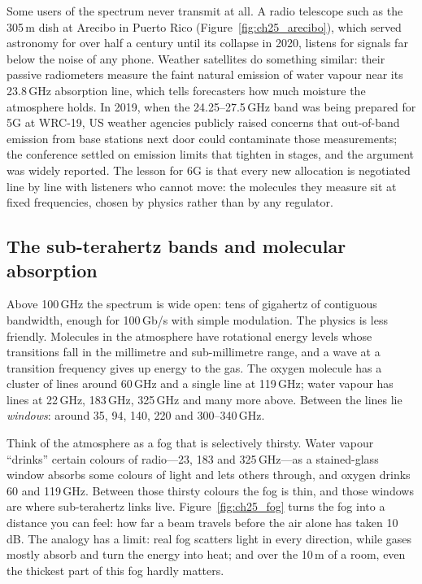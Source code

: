 
\begin{history}
Some users of the spectrum never transmit at all. A radio telescope such as the 305\,m dish at
Arecibo in Puerto Rico (Figure~\ref{fig:ch25_arecibo}), which served astronomy for over half a
century until its collapse in 2020, listens for signals far below the noise of any phone. Weather
satellites do something similar: their passive radiometers measure the faint natural emission of
water vapour near its 23.8\,GHz absorption line, which tells forecasters how much moisture the
atmosphere holds. In 2019, when the 24.25--27.5\,GHz band was being prepared for 5G at WRC-19, US
weather agencies publicly raised concerns that out-of-band emission from base stations next door
could contaminate those measurements; the conference settled on emission limits that tighten in
stages, and the argument was widely reported. The lesson for 6G is that every new allocation is
negotiated line by line with listeners who cannot move: the molecules they measure sit at fixed
frequencies, chosen by physics rather than by any regulator.
\end{history}

\subsection{The sub-terahertz bands and molecular absorption}

Above 100\,GHz the spectrum is wide open: tens of gigahertz of contiguous bandwidth, enough for
100\,Gb/s with simple modulation. The physics is less friendly. Molecules in the atmosphere have
rotational energy levels whose transitions fall in the millimetre and sub-millimetre range, and a
wave at a transition frequency gives up energy to the gas. The oxygen molecule has a cluster of lines
around 60\,GHz and a single line at 119\,GHz; water vapour has lines at 22\,GHz, 183\,GHz, 325\,GHz and
many more above. Between the lines lie \emph{windows}: around 35, 94, 140, 220 and 300--340\,GHz.

\begin{analogy}
Think of the atmosphere as a fog that is selectively thirsty. Water vapour ``drinks'' certain colours
of radio---23, 183 and 325\,GHz---as a stained-glass window absorbs some colours of light and lets
others through, and oxygen drinks 60 and 119\,GHz. Between those thirsty colours the fog is thin, and
those windows are where sub-terahertz links live. Figure~\ref{fig:ch25_fog} turns the fog into a
distance you can feel: how far a beam travels before the air alone has taken 10\,dB. The analogy has
a limit: real fog scatters light in every direction, while gases mostly absorb and turn the energy
into heat; and over the 10\,m of a room, even the thickest part of this fog hardly matters.
\end{analogy}

